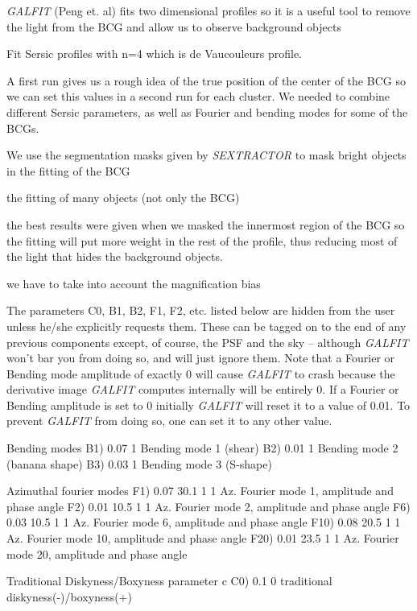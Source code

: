 \textit{GALFIT} (Peng et. al) fits two dimensional profiles so it is a useful tool to remove the light from the BCG and allow us to observe background objects

Fit Sersic profiles with n=4 which is de Vaucouleurs profile. 

A first run gives us a rough idea of the true position of the center of the BCG so we can set this values in a second run for each cluster. We needed to combine different Sersic parameters, as well as Fourier and bending modes for some of the BCGs.

We use the segmentation masks given by \textit{SEXTRACTOR} to mask bright objects in the fitting of the BCG

the fitting of many objects (not only the BCG)

the best results were given when we masked the innermost region of the BCG so the fitting will put more weight in the rest of the profile, thus reducing most of the light that hides the background objects.

we have to take into account the magnification bias

The parameters C0, B1, B2, F1, F2, etc. listed below are hidden from the user unless he/she explicitly requests them.  These can  be tagged on to the end of any previous components except, of course, the PSF and the sky -- although \textit{GALFIT} won't bar you from doing so, and will just ignore them.  Note that a Fourier or Bending mode amplitude of exactly 0 will cause \textit{GALFIT} to crash because the derivative image \textit{GALFIT} computes internally will be entirely 0.  If a Fourier or Bending amplitude is set to 0 initially \textit{GALFIT} will reset it to a value of 0.01.  To prevent \textit{GALFIT} from doing so, one can set it to any 
other value.

Bending modes
B1)  0.07      1        Bending mode 1 (shear)
B2)  0.01      1        Bending mode 2 (banana shape)
B3)  0.03      1        Bending mode 3 (S-shape)

Azimuthal fourier modes
F1)  0.07  30.1  1  1   Az. Fourier mode 1, amplitude and phase angle
F2)  0.01  10.5  1  1   Az. Fourier mode 2, amplitude and phase angle
F6)  0.03  10.5  1  1  Az. Fourier mode 6, amplitude and phase angle
F10)  0.08  20.5  1  1   Az. Fourier mode 10, amplitude and phase angle
F20)  0.01  23.5  1  1   Az. Fourier mode 20, amplitude and phase angle

Traditional Diskyness/Boxyness parameter c
C0) 0.1         0       traditional diskyness(-)/boxyness(+)

